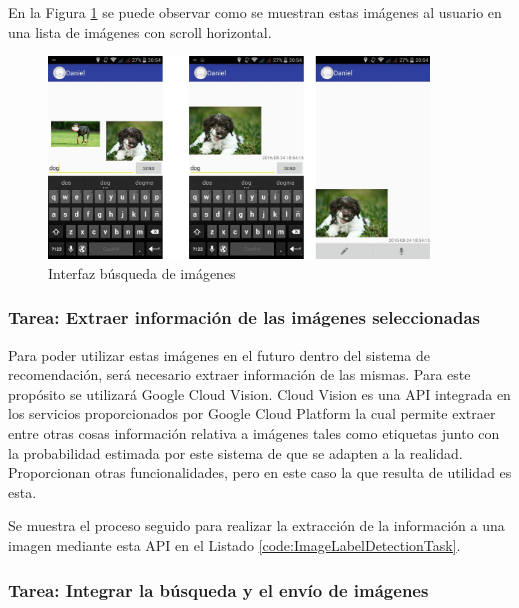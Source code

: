En la Figura \ref{fig:interfaz-busqueda} se puede observar como se muestran estas imágenes al usuario en una lista de imágenes con scroll horizontal.

\begin{figure}[!h]
\begin{center}
\includegraphics[width=0.9\textwidth]{./figures/interfaz-busqueda.jpg}
\caption{Interfaz búsqueda de imágenes}
\label{fig:interfaz-busqueda}
\end{center}
\end{figure}


\subsubsection{Tarea: Extraer información de las imágenes seleccionadas}

Para poder utilizar estas imágenes en el futuro dentro del sistema de recomendación, será necesario extraer información de las mismas. Para este propósito se utilizará Google Cloud Vision. Cloud Vision es una \ac{API} integrada en los servicios proporcionados por Google Cloud Platform la cual permite extraer entre otras cosas información relativa a imágenes tales como etiquetas junto con la probabilidad estimada por este sistema de que se adapten a la realidad. Proporcionan otras funcionalidades, pero en este caso la que resulta de utilidad es esta.

Se  muestra el proceso seguido para realizar la extracción de la información a una imagen mediante esta \ac{API} en el Listado \ref{code:ImageLabelDetectionTask}.\\



\subsubsection{Tarea: Integrar la búsqueda y el envío de imágenes}


